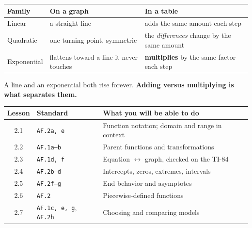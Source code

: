 \documentclass[aspectratio=169, 11pt]{beamer}
\begin{document}
\begin{frame}[t, plain]
  \renewcommand{\arraystretch}{1.4}
  \begin{tabularx}{\textwidth}{@{}p{3.0cm} p{4.6cm} X@{}}
    \textbf{Family} & \textbf{On a graph} & \textbf{In a table} \\
    \hline
    Linear & a straight line & adds the same amount each step \\
    Quadratic & one turning point, symmetric & the \emph{differences} change by the same amount \\
    Exponential & flattens toward a line it never touches & \textbf{multiplies} by the same
      factor each step \\
  \end{tabularx}
  \vspace{0.4cm}

  A line and an exponential both rise forever. \textbf{Adding versus multiplying is what
  separates them.}
\end{frame}

\begin{frame}[t, plain]
  \renewcommand{\arraystretch}{1.2}
  \small
  \begin{tabularx}{\textwidth}{@{}c p{2.9cm} X@{}}
    \textbf{Lesson} & \textbf{Standard} & \textbf{What you will be able to do} \\
    \hline
    2.1 & \texttt{AF.2a, e}      & Function notation; domain and range in context \\
    2.2 & \texttt{AF.1a--b}      & Parent functions and transformations \\
    2.3 & \texttt{AF.1d, f}      & Equation $\leftrightarrow$ graph, checked on the TI-84 \\
    2.4 & \texttt{AF.2b--d}      & Intercepts, zeros, extremes, intervals \\
    2.5 & \texttt{AF.2f--g}      & End behavior and asymptotes \\
    2.6 & \texttt{AF.2}          & Piecewise-defined functions \\
    2.7 & \texttt{AF.1c, e, g}, \texttt{AF.2h} & Choosing and comparing models \\
  \end{tabularx}
\end{frame}
\end{document}
